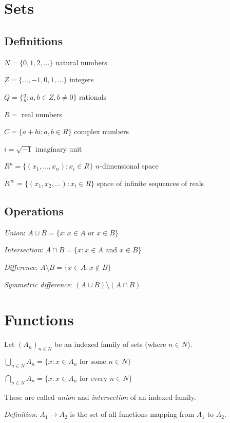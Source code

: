 \documentclass[12pt,a4paper]{article}
\begin{document}
\section{Sets}

\subsection{Definitions}

$N = \{0, 1, 2, \ldots\}$ natural numbers

$Z = \{\ldots, -1, 0, 1, \ldots\}$ integers

$Q = \{\frac{a}{b} : a, b \in Z, b \neq 0\}$ rationals

$R =$ real numbers

$C = \{a + bi : a, b \in R\}$ complex numbers

$i = \sqrt{-1}$ imaginary unit

$R^n = \{(x_1, \ldots, x_n) : x_i \in R\}$ $n$-dimensional space

$R^\infty = \{(x_1, x_2, \ldots) : x_i \in R\}$ space of infinite sequences of reals

\subsection{Operations}

\textit{Union}: $A \cup B = \{x : x \in A \text{ or } x \in B\}$

\textit{Intersection}: $A \cap B = \{x : x \in A \text{ and } x \in B\}$

\textit{Difference}: $A \setminus B = \{x \in A : x \notin B\}$

\textit{Symmetric difference}: $(A \cup B) \setminus (A \cap B)$

\section{Functions}

Let $(A_n)_{n \in N}$ be an indexed family of sets (where $n \in N$).

\begin{center}
$\bigcup_{n \in N} A_n = \{x : x \in A_n \text{ for some } n \in N\}$

$\bigcap_{n \in N} A_n = \{x : x \in A_n \text{ for every } n \in N\}$
\end{center}

These are called \textit{union} and \textit{intersection} of an indexed family.

\textit{Definition}: $A_1 \to A_2$ is the set of all functions mapping from $A_1$ to $A_2$.
\end{document}
